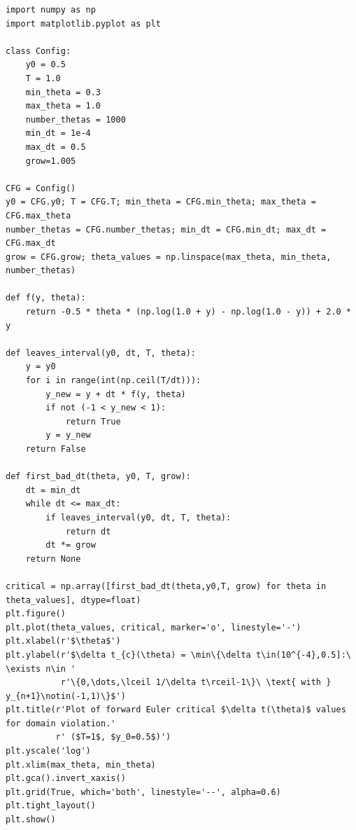 \documentclass[]{article}
\begin{document}
\begin{verbatim}
import numpy as np
import matplotlib.pyplot as plt

class Config:
    y0 = 0.5
    T = 1.0
    min_theta = 0.3
    max_theta = 1.0
    number_thetas = 1000
    min_dt = 1e-4
    max_dt = 0.5
    grow=1.005
    
CFG = Config()
y0 = CFG.y0; T = CFG.T; min_theta = CFG.min_theta; max_theta = CFG.max_theta
number_thetas = CFG.number_thetas; min_dt = CFG.min_dt; max_dt = CFG.max_dt
grow = CFG.grow; theta_values = np.linspace(max_theta, min_theta, number_thetas)

def f(y, theta):
    return -0.5 * theta * (np.log(1.0 + y) - np.log(1.0 - y)) + 2.0 * y

def leaves_interval(y0, dt, T, theta):
    y = y0
    for i in range(int(np.ceil(T/dt))):
        y_new = y + dt * f(y, theta)
        if not (-1 < y_new < 1):
            return True
        y = y_new
    return False

def first_bad_dt(theta, y0, T, grow):
    dt = min_dt
    while dt <= max_dt:
        if leaves_interval(y0, dt, T, theta):
            return dt
        dt *= grow
    return None

critical = np.array([first_bad_dt(theta,y0,T, grow) for theta in theta_values], dtype=float)
plt.figure()
plt.plot(theta_values, critical, marker='o', linestyle='-')
plt.xlabel(r'$\theta$')
plt.ylabel(r'$\delta t_{c}(\theta) = \min\{\delta t\in(10^{-4},0.5]:\ \exists n\in '
           r'\{0,\dots,\lceil 1/\delta t\rceil-1\}\ \text{ with } y_{n+1}\notin(-1,1)\}$')
plt.title(r'Plot of forward Euler critical $\delta t(\theta)$ values for domain violation.'
          r' ($T=1$, $y_0=0.5$)')
plt.yscale('log')
plt.xlim(max_theta, min_theta)
plt.gca().invert_xaxis()
plt.grid(True, which='both', linestyle='--', alpha=0.6)
plt.tight_layout()
plt.show()
\end{verbatim}

\hrulefill
\end{document}

